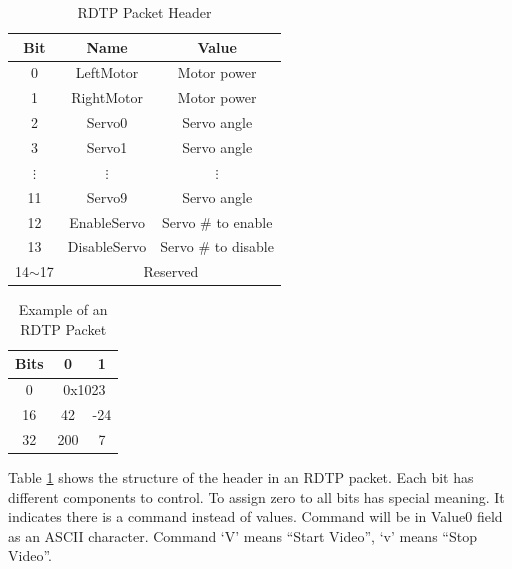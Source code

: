 \documentclass[journal]{IEEEtran}
\begin{document}
\begin{table}[!t]
\centering
\caption{RDTP Packet Header} \label{tbl:rdtpheader}
\begin{tabular}{c|cc}
\rowcolor[HTML]{C0C0C0} 
Bit                                & Name         & Value               \\ \hline
\cellcolor[HTML]{C0C0C0}0          & LeftMotor    & Motor power         \\
\rowcolor[HTML]{FFCCC9} 
\cellcolor[HTML]{C0C0C0}1          & RightMotor   & Motor power         \\
\cellcolor[HTML]{C0C0C0}2          & Servo0       & Servo angle         \\
\rowcolor[HTML]{FFCCC9} 
\cellcolor[HTML]{C0C0C0}3          & Servo1       & Servo angle         \\
\cellcolor[HTML]{C0C0C0}$\vdots$   & $\vdots$     & $\vdots$            \\
\rowcolor[HTML]{FFCCC9} 
\cellcolor[HTML]{C0C0C0}11         & Servo9       & Servo angle         \\
\cellcolor[HTML]{C0C0C0}12         & EnableServo  & Servo \# to enable  \\
\rowcolor[HTML]{FFCCC9} 
\cellcolor[HTML]{C0C0C0}13         & DisableServo & Servo \# to disable \\
\cellcolor[HTML]{C0C0C0}14$\sim$17 & \multicolumn{2}{c}{Reserved}      
\end{tabular}
\end{table}

\begin{table}[!t]
\centering
\caption{Example of an RDTP Packet} \label{tbl:rdtpex}
\begin{tabular}{c|cc}
\rowcolor[HTML]{C0C0C0} 
Bits                       & 0            & 1           \\ \hline
\cellcolor[HTML]{C0C0C0}0  & \multicolumn{2}{c}{0x1023} \\
\rowcolor[HTML]{FFCCC9} 
\cellcolor[HTML]{C0C0C0}16 & 42           & -24         \\
\cellcolor[HTML]{C0C0C0}32 & 200          & 7          
\end{tabular}
\end{table}

Table \ref{tbl:rdtpheader} shows the structure of the header in an RDTP packet.
Each bit has different components to control.
To assign zero to all bits has special meaning.
It indicates there is a command instead of values.
Command will be in Value0 field as an ASCII character.
Command `V' means ``Start Video'', `v' means ``Stop Video''.
\end{document}
